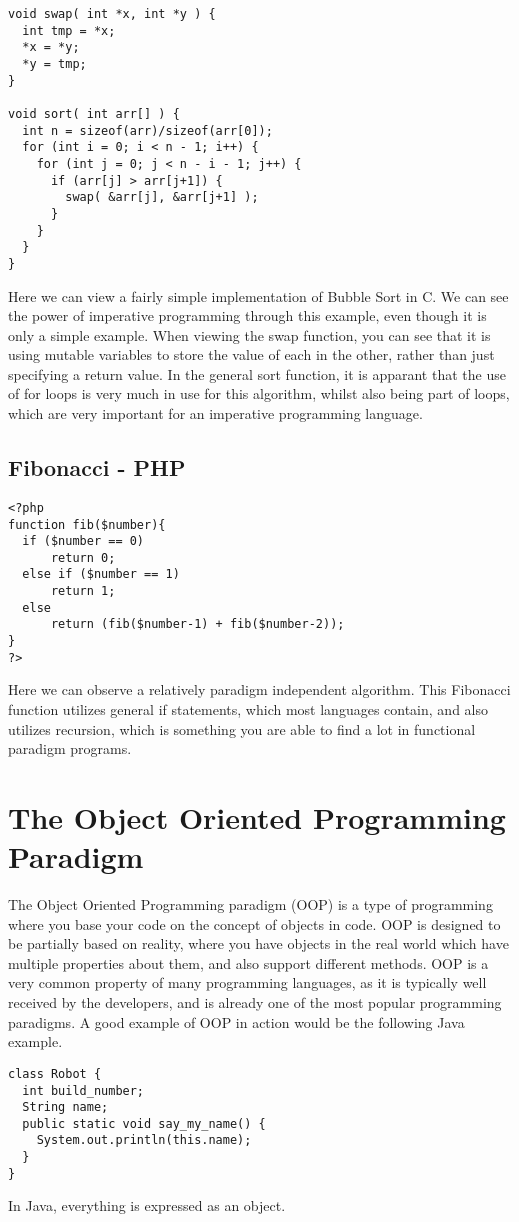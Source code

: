 \documentclass{report}
\begin{document}
\begin{lstlisting}
void swap( int *x, int *y ) {
  int tmp = *x;
  *x = *y;
  *y = tmp;
}

void sort( int arr[] ) {
  int n = sizeof(arr)/sizeof(arr[0]);
  for (int i = 0; i < n - 1; i++) {
    for (int j = 0; j < n - i - 1; j++) {
      if (arr[j] > arr[j+1]) {
        swap( &arr[j], &arr[j+1] );
      }
    }
  }
}
\end{lstlisting}
Here we can view a fairly simple implementation of Bubble Sort in C. We can see the power of imperative programming through this example, even though it is only a simple example. When viewing the swap function, you can see that it is using mutable variables to store the value of each in the other, rather than just specifying a return value. In the general sort function, it is apparant that the use of for loops is very much in use for this algorithm, whilst also being part of loops, which are very important for an imperative programming language.

\subsection{Fibonacci - PHP}

\begin{lstlisting}
<?php
function fib($number){
  if ($number == 0)
      return 0;
  else if ($number == 1)
      return 1;
  else
      return (fib($number-1) + fib($number-2));
}
?>
\end{lstlisting}
Here we can observe a relatively paradigm independent algorithm. This Fibonacci function utilizes general if statements, which most languages contain, and also utilizes recursion, which is something you are able to find a lot in functional paradigm programs.


\section{The Object Oriented Programming Paradigm}
The Object Oriented Programming paradigm (OOP) is a type of programming where you base your code on the concept of objects in code. OOP is designed to be partially based on reality, where you have objects in the real world which have multiple properties about them, and also support different methods. OOP is a very common property of many programming languages, as it is typically well received by the developers, and is already one of the most popular programming paradigms. A good example of OOP in action would be the following Java example.
\begin{lstlisting}
class Robot {
  int build_number;
  String name;
  public static void say_my_name() {
    System.out.println(this.name);
  }
}
\end{lstlisting}
In Java, everything is expressed as an object.
\end{document}
